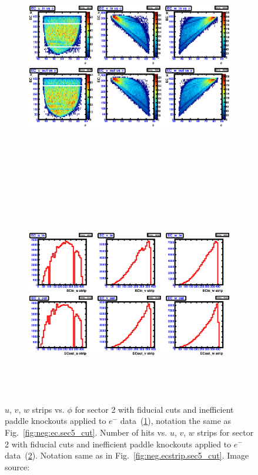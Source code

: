 \begin{figure}[!ht]
  \centering
  \begin{subfigure}[b]{\figwidth}
  \includegraphics[width=\figwidth, height=3.5in,valign=c]{figures/calib/ec/pim_ecuvw_phi_afterGeoFid_sec2.eps}\caption{}\label{fig:EC_III_II}
  \end{subfigure}%
  \\
  \begin{subfigure}[b]{\figwidth}
  \includegraphics[width=\figwidth, height=3.5in,valign=c]{figures/calib/ec/pim_ecuvw_afterGeoFid_sec2.eps}\caption{}\label{fig:EC_IV_II}
  \end{subfigure}%
      \caption { $u$, $v$, $w$ strips vs. $\phi$ for sector 2 with fiducial cuts and inefficient paddle knockouts applied to $e^-$ data~(\ref{fig:EC_III_II}), notation the same as Fig.~\ref{fig:neg:ec.sec5_cut}. Number of hits vs.  $u$, $v$, $w$ strips for sector 2 with fiducial cuts and inefficient paddle knockouts applied to $e^-$ data~(\ref{fig:EC_IV_II}). Notation same as in Fig.~\ref{fig:neg.ecstrip.sec5_cut}. Image source:~\cite{clas.thesis.kunkel}}
        \label{fig:EC_cut_II}
\end{figure}

